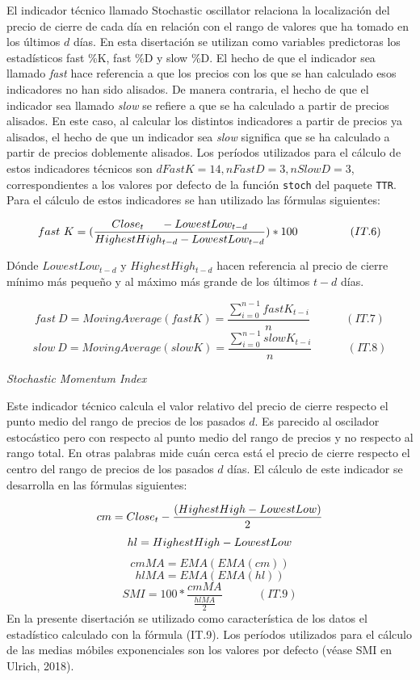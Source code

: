 \documentclass[]{DissertateUSU}
\begin{document}
\noindent El indicador técnico llamado Stochastic oscillator relaciona
la localización del precio de cierre de cada día en relación con el
rango de valores que ha tomado en los últimos \(d\) días. En esta
disertación se utilizan como variables predictoras los estadísticos fast
\%K, fast \%D y slow \%D. El hecho de que el indicador sea llamado
\emph{fast} hace referencia a que los precios con los que se han
calculado esos indicadores no han sido alisados. De manera contraria, el
hecho de que el indicador sea llamado \emph{slow} se refiere a que se ha
calculado a partir de precios alisados. En este caso, al calcular los
distintos indicadores a partir de precios ya alisados, el hecho de que
un indicador sea \emph{slow} significa que se ha calculado a partir de
precios doblemente alisados. Los períodos utilizados para el cálculo de
estos indicadores técnicos son \(dFastK = 14, nFastD = 3, nSlowD = 3\),
correspondientes a los valores por defecto de la función \texttt{stoch}
del paquete \texttt{TTR}. Para el cálculo de estos indicadores se han
utilizado las fórmulas siguientes:

\[fast \ K = (\frac{Close_t\\-LowestLow_{t-d}}{HighestHigh_{t-d}\\-LowestLow_{t-d}})*100 \ \ \ \ \ \ \ \ \ \ \ \ \ \ (IT.6)\]

\noindent Dónde \(LowestLow_{t-d}\) y \(HighestHigh_{t-d}\) hacen
referencia al precio de cierre mínimo más pequeño y al máximo más grande
de los últimos \(t-d\) días.

\[fast \ D = MovingAverage(fastK)=\frac{\sum_{i=0}^{n-1}fastK_{t-i}}{n} \ \ \ \ \ \ \ \ \ \ \ \ \ \ (IT.7)\]
\[slow \ D = MovingAverage(slowK)=\frac{\sum_{i=0}^{n-1}slowK_{t-i}}{n} \ \ \ \ \ \ \ \ \ \ \ \ \ \ (IT.8)\]

\emph{Stochastic Momentum Index}

\noindent Este indicador técnico calcula el valor relativo del precio de
cierre respecto el punto medio del rango de precios de los pasados
\(d\). Es parecido al oscilador estocástico pero con respecto al punto
medio del rango de precios y no respecto al rango total. En otras
palabras mide cuán cerca está el precio de cierre respecto el centro del
rango de precios de los pasados \(d\) días. El cálculo de este indicador
se desarrolla en las fórmulas siguientes:

\[cm = Close_t - \frac{(HighestHigh\\-LowestLow)}{2}\]
\[hl = HighestHigh\\-LowestLow\] \[cmMA = EMA(EMA(cm))\]
\[hlMA = EMA(EMA(hl))\]
\[SMI = 100 * \frac{cmMA}{\frac{hlMA}{2}} \ \ \ \ \ \ \ \ \ \ \ \ \ \ (IT.9)\]
\noindent En la presente disertación se utilizado como característica de
los datos el estadístico calculado con la fórmula (IT.9). Los períodos
utilizados para el cálculo de las medias móbiles exponenciales son los
valores por defecto (véase SMI en Ulrich, 2018).
\end{document}
